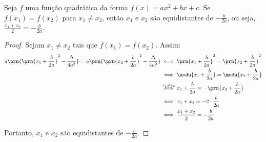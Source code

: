 \begin{proposition}
Seja $f$ uma função quadrática da forma $f(x) = ax^2 + bx +c$. Se
$f(x_1) = f(x_2)$ para $x_1 \neq x_2$, então $x_1$ e $x_2$ são
equidistantes de $-\frac{b} {2a}$, ou seja, $\frac{x_1 +x_2} 2 =
-\frac{b}{2a}$.
\end{proposition}

\begin{proof}
    Sejam $x_1 \ne x_2$ tais que $f(x_1) = f(x_2)$. Assim:
    \begin{align*}
        a\prn{ \prn{x_1+\frac{b}{2a}}^2 - \frac{\Delta}{4a^2}  } = a\prn{ \prn{x_2+\frac{b}{2a}}^2 - \frac{\Delta}{4a^2}  }
        &\iff \prn{x_1+\frac b {2a}}^2 = \prn{x_2+\frac b {2a}}^2 \\ 
        &\iff \modu{x_1 + \frac b {2a}} = \modu{x_2 + \frac b {2a}} \\ 
        &\stackrel{x_1 \ne x_2}{\iff} x_1 + \frac b {2a} = -\prn{x_2 + \frac b {2a}}  \\
        &\iff x_1 + x_2 = - 2 \cdot \frac b {2a} \\
        &\iff \frac{x_1+x_2} 2 = -\frac b {2a}
    \end{align*}

    Portanto, $x_1$ e $x_2$ são equidistantes de $-\frac b {2a}$.
\end{proof}